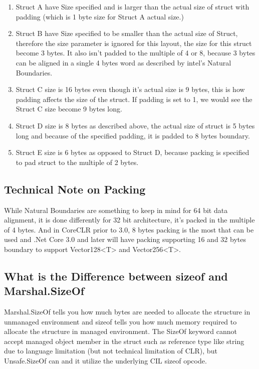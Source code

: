 \begin{enumerate}
	\item Struct A have Size specified and is larger than the actual size of struct with padding (which is 1 byte size for Struct A actual size.)
	\item Struct B have Size specified to be smaller than the actual size of Struct, therefore the size parameter is ignored for this layout, the size for this struct become 3 bytes. It also isn't padded to the multiple of 4 or 8, because 3 bytes can be aligned in a single 4 bytes word as described by intel's Natural Boundaries.
	\item Struct C size is 16 bytes even though it's actual size is 9 bytes, this is how padding affects the size of the struct. If padding is set to 1, we would see the Struct C size become 9 bytes long.
	\item Struct D size is 8 bytes as described above, the actual size of struct is 5 bytes long and because of the specified padding, it is padded to 8 bytes boundary.
	\item Struct E size is 6 bytes as opposed to Struct D, because packing is specified to pad struct to the multiple of 2 bytes.
\end{enumerate}

\subsection{Technical Note on Packing}
While Natural Boundaries are something to keep in mind for 64 bit data alignment, it is done differently for 32 bit architecture, it's packed in the multiple of 4 bytes. And in CoreCLR prior to 3.0, 8 bytes packing is the most that can be used and .Net Core 3.0 and later will have packing supporting 16 and 32 bytes boundary to support Vector128<T> and Vector256<T>. 

\subsection{What is the Difference between sizeof and Marshal.SizeOf}
Marshal.SizeOf tells you how much bytes are needed to allocate the structure in unmanaged environment and sizeof tells you how much memory required to allocate the structure in managed environment. The SizeOf keyword cannot accept managed object member in the struct such as reference type like string due to language limitation (but not technical limitation of CLR), but Unsafe.SizeOf can and it utilize the underlying CIL sizeof opcode.

